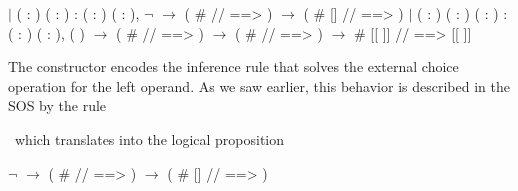 \begin{coqdoccode}
	\coqdocnoindent
	\ensuremath{|}  ( : ) (  : ) :\coqdoceol
	\coqdocindent{1.00em}
	\coqdockw{\ensuremath{\forall}} ( : ) ( : ),\coqdoceol
	\coqdocindent{3.00em}
	\ensuremath{\lnot}    \ensuremath{\rightarrow}\coqdoceol
	\coqdocindent{3.00em}
	( \#  //  ==> ) \ensuremath{\rightarrow}\coqdoceol
	\coqdocindent{3.00em}
	( \#   //  ==> )\coqdoceol
	\coqdocnoindent
	\ensuremath{|}  ( : ) (  : ) (  :  ) :\coqdoceol
	\coqdocindent{1.00em}
	\coqdockw{\ensuremath{\forall}} (  : ) ( : ),\coqdoceol
	\coqdocindent{3.00em}
	  (   ) \ensuremath{\rightarrow}\coqdoceol
	\coqdocindent{3.00em}
	( \#  //   ==> ) \ensuremath{\rightarrow}\coqdoceol
	\coqdocindent{3.00em}
	( \#  //   ==> ) \ensuremath{\rightarrow}\coqdoceol
	\coqdocindent{3.00em}
	 \#  [[    ]]  //   ==>  [[    ]] \coqdoceol
\end{coqdoccode}

The  constructor encodes the inference rule that solves the external choice operation for the left operand. As we saw earlier, this behavior is described in the SOS by the rule \
\
\begin{prooftree}
\end{prooftree}
\
which translates into the logical proposition

\begin{coqdoccode}
	\coqdocnoindent
	\ensuremath{\lnot}    \ensuremath{\rightarrow}
	(\coqdocvar{S} \#  //  ==> ) \ensuremath{\rightarrow}
	( \#  []  //  ==> )\coqdoceol
\end{coqdoccode}

